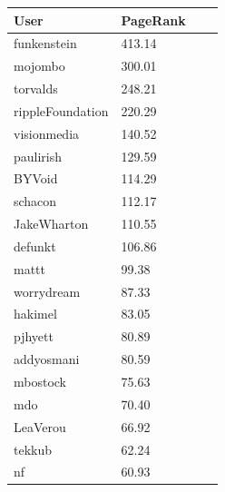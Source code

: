 \begin{table}[ht]
\centering
\small\renewcommand{\arraystretch}{1.4}  
%
\label{follow_pagerank_table}
%
\begin{tabularx}{0.4\textwidth}{lXXX}
\hline
\rowcolor{tableheadcolor}
User & PageRank \\
\hline
funkenstein& 413.14 \\
mojombo & 300.01 \\
torvalds & 248.21 \\
rippleFoundation & 220.29 \\
visionmedia & 140.52 \\
paulirish & 129.59 \\
BYVoid & 114.29 \\
schacon & 112.17 \\
JakeWharton & 110.55 \\
defunkt & 106.86 \\
mattt & 99.38 \\
worrydream & 87.33 \\
hakimel & 83.05 \\
pjhyett & 80.89 \\
addyosmani & 80.59 \\
mbostock & 75.63 \\
mdo & 70.40 \\
LeaVerou & 66.92 \\
tekkub & 62.24 \\
nf & 60.93 \\

\hline
\end{tabularx}
\end{table}




